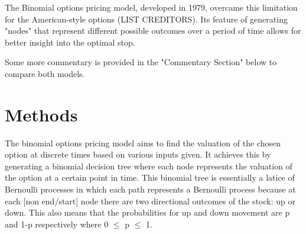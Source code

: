 \documentclass[12pt, letterpaper]{article}
\begin{document}
The Binomial options pricing model, developed in 1979, overcame this limitation for the American-style options (LIST CREDITORS).
Its feature of generating "nodes" that represent different possible outcomes over a period of time allows for better insight into the optimal stop.

Some more commentary is provided in the "Commentary Section" below to compare both models.

\pagebreak

\section{Methods}

The binomial options pricing model aims to find the valuation of the chosen option at discrete times based on various inputs given.
It achieves this by generating a binomial decision tree where each node represents the valuation of the option at a certain point in time.
This binomial tree is essentially a latice of Bernoulli processes in which each path represents a Bernoulli process because at each [non end/start] node there are two directional outcomes of the stock: up or down.
This also means that the probabilities for up and down movement are p and 1-p respectively where 0 $\leq$ p $\leq$ 1.

\end{document}
